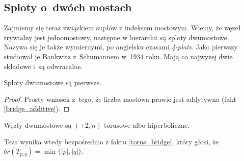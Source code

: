 \subsection{Sploty o~dwóch mostach} %
\label{sub:twobridge}
Zajmiemy się teraz związkiem supłów z indeksem mostowym.
Wiemy, że węzeł trywialny jest jednomostowy, następne w hierarchii są sploty dwumostowe.
Nazywa się je także wymiernymi, po angielsku czasami \emph{4-plats}.
Jako pierwszy studiował je Bankwitz z~Schumannem w~1934 roku.
Mają co najwyżej dwie składowe i~są odwracalne.

\begin{proposition}
    Sploty dwumostowe są pierwsze.
\end{proposition}

\begin{proof}
    Prosty wniosek z~tego, że liczba mostowa prawie jest addytywna (fakt \ref{bridge_additive}).
\end{proof}

\begin{corollary}
    \label{prp:two_bridge_hyperbolic}
    Węzły dwumostowe są $(\pm 2, n)$-torusowe albo hiperboliczne.
\end{corollary}

\begin{tobedone}
    Teza wynika wtedy bezpośrednio z faktu \ref{torus_bridge}, który głosi, że $br(T_{p, q}) = \min\{|p|, |q|\}$.
\end{tobedone}



